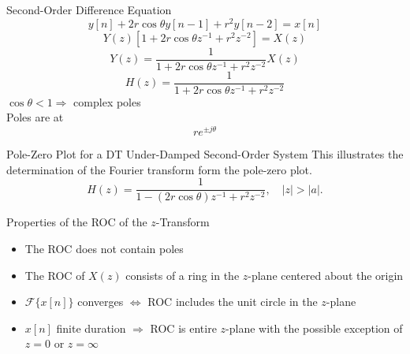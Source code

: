 \begin{frame}{Second-Order Difference Equation}
    \begin{equation*}
        y[n] + 2r\cos\theta y[n-1] + r^2y[n-2]= x[n]
    \end{equation*}
    \pause
    {
        \begin{equation*}
            Y(z)\left[1+2r\cos\theta z^{-1} + r^2z^{-2}\right] = X(z)
        \end{equation*}
        \pause
        \begin{equation*}
            Y(z) = \frac{1}{1+2r\cos\theta z^{-1} + r^2z^{-2}} X(z)
        \end{equation*}
        \pause
        \begin{equation*}
            H(z) = \frac{1}{1+2r\cos\theta z^{-1} + r^2z^{-2}}
        \end{equation*}
        $\cos\theta < 1 \Rightarrow$  complex poles\\
        Poles are at
        \pause
        \begin{equation*}
            re^{\pm j \theta}
        \end{equation*}
    }
\end{frame}

\begin{frame}{Pole-Zero Plot for a DT Under-Damped Second-Order System}
    This illustrates the determination of the Fourier transform form the pole-zero plot.
    \begin{equation*}
        H(z) = \frac{1}{1-(2r\cos\theta)z^{-1} + r^2z^{-2}}, \quad |z| >|a|.
    \end{equation*}
    {
        \begin{center}
            
        \end{center}
    }
\end{frame}


\begin{frame}
    {
        \begin{center}
            
        \end{center}
    }
\end{frame}

\begin{frame}{Properties of the ROC of the $z$-Transform}
    \begin{itemize}
      \item The ROC does not contain poles
      \item The ROC of $X(z)$ consists of a ring in the $z$-plane centered about the origin
      \item $\mathcal{F}\{x[n]\}$ converges $\Leftrightarrow$ ROC includes the unit circle in the $z$-plane
      \item $x[n]$ finite duration $\Rightarrow$ ROC is entire $z$-plane with the possible exception of $z = 0$ or $z = \infty$
    \end{itemize}
\end{frame}

